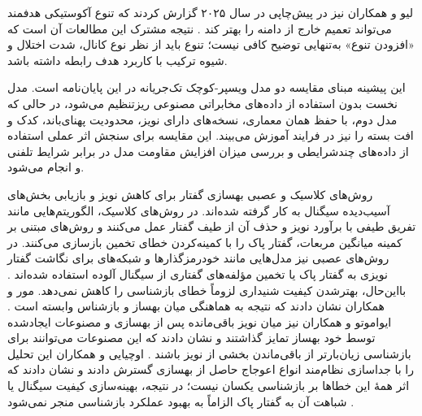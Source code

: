 لیو و همکاران نیز در پیش‌چاپی در سال ۲۰۲۵ گزارش کردند که تنوع آکوستیکی هدفمند می‌تواند تعمیم خارج از دامنه را بهتر کند . نتیجه مشترک این مطالعات آن است که «افزودن تنوع» به‌تنهایی توضیح کافی نیست؛ تنوع باید از نظر نوع کانال، شدت اختلال و شیوه ترکیب با کاربرد هدف رابطه داشته باشد.

این پیشینه مبنای مقایسه دو مدل ویسپر-کوچک تک‌جریانه در این پایان‌نامه است. مدل نخست بدون استفاده از داده‌های مخابراتی مصنوعی ریزتنظیم می‌شود، در حالی که مدل دوم، با حفظ همان معماری، نسخه‌های دارای نویز، محدودیت پهنای‌باند، کدک و افت بسته را نیز در فرایند آموزش می‌بیند. این مقایسه برای سنجش اثر عملی استفاده از داده‌های چندشرایطی و بررسی میزان افزایش مقاومت مدل در برابر شرایط تلفنی و  انجام می‌شود.


روش‌های کلاسیک و عصبی بهسازی گفتار برای کاهش نویز و بازیابی بخش‌های آسیب‌دیده سیگنال به کار گرفته شده‌اند. در روش‌های کلاسیک، الگوریتم‌هایی مانند تفریق طیفی با برآورد نویز و حذف آن از طیف گفتار عمل می‌کنند و روش‌های مبتنی بر کمینه میانگین مربعات، گفتار پاک را با کمینه‌کردن خطای تخمین بازسازی می‌کنند. در روش‌های عصبی نیز مدل‌هایی مانند خودرمزگذارها و شبکه‌های  برای نگاشت گفتار نویزی به گفتار پاک یا تخمین مؤلفه‌های گفتاری از سیگنال آلوده استفاده شده‌اند . بااین‌حال، بهترشدن کیفیت شنیداری لزوماً خطای بازشناسی را کاهش نمی‌دهد. مور و همکاران نشان دادند که نتیجه به هماهنگی میان بهساز و بازشناس وابسته است . ایواموتو و همکاران نیز میان نویز باقی‌مانده پس از بهسازی و مصنوعات ایجادشده توسط خود بهساز تمایز گذاشتند و نشان دادند که این مصنوعات می‌توانند برای بازشناسی زیان‌بارتر از باقی‌ماندن بخشی از نویز باشند . اوچیایی و همکاران این تحلیل را با جداسازی نظام‌مند انواع اعوجاج حاصل از بهسازی گسترش دادند و نشان دادند که اثر همهٔ این خطاها بر بازشناسی یکسان نیست؛ در نتیجه، بهینه‌سازی کیفیت سیگنال یا شباهت آن به گفتار پاک الزاماً به بهبود عملکرد بازشناسی منجر نمی‌شود .

